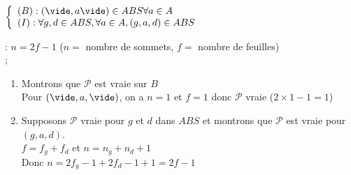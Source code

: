  \\
$\left\{ \begin{array}{l}
	(B) : (\vide,a\vide)\in ABS \forall a \in A \\
	(I) : \forall g,d\in ABS, \forall a\in A, (g,a,d)\in ABS 
\end{array} \right.$ \\
\par
{} : $n=2f-1$ ($n=$ nombre de sommets, $f=$ nombre de feuilles) \\
 ;
	\begin{enumerate}
	\item Montrons que $\mathcal{P}$ est vraie sur $B$ \\
	Pour $(\vide,a,\vide)$, on a $n=1$ et $f=1$ donc $\mathcal{P}$ vraie ($2\times 1 - 1 = 1$) \\
	\item Supposons $\mathcal{P}$ vraie pour $g$ et $d$ dans $ABS$ et montrons que $\mathcal{P}$ est vraie pour $(g,a,d)$. \\
	$f=f_g+f_d$ et $n=n_g+n_d+1$ \\
	Donc $n=2f_g-1+2f_d-1+1 = 2f-1$
	\end{enumerate}
	
